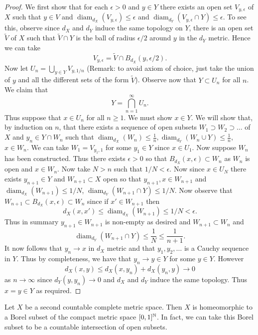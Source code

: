 \documentclass[twoside, a4paper, 10pt]{amsart}
\begin{document}
\begin{proof} We first show that for each $\epsilon>0$ and $y \in Y$ there exists an open set $V_{y,\epsilon}$ of $X$ such that $y \in V$ and $\operatorname{diam}_{d_X}(V_{y,\epsilon}) \leq \epsilon$ and $\operatorname{diam}_{d_Y}(V_{y,\epsilon} \cap Y) \leq \epsilon$. To see this, observe since $d_X$ and $d_Y$ induce the same topology on $Y$, there is an open set $\tilde{V}$ of $X$ such that $\tilde{V} \cap Y$ is the ball of radius $\epsilon/2$ around $y$ in the $d_Y$ metric. Hence we can take $$V_{y, \epsilon} = \tilde{V} \cap B_{d_X}(y, \epsilon/2).$$ Now let $U_n = \bigcup_{y \in Y} V_{y,1/n}$ (Remark: to avoid axiom of choice, just take the union of $y$ and all the different sets of the form $\tilde{V}$). Observe now that $Y \subset U_n$ for all $n$. 
We claim that $$Y = \bigcap_{n = 1}^{\infty} U_n.$$ Thus suppose that $x \in U_n$ for all $n \geq 1$. We must show $x \in Y$. We will show that, by induction on $n$, that there exists a sequence of open subsets $W_1 \supset W_2 \supset \ldots$ of $X$  and $y_n \in Y \cap W_n$ such that $\operatorname{diam}_{d_X}(W_n) \leq \frac{1}{n}, \operatorname{diam}_{d_Y}(W_n \cup Y) \leq \frac{1}{n}$, $x \in W_n$. 
We can take $W_1 = V_{y_1,1}$ for some $y_1 \in Y$ since $x \in U_1$. Now suppose $W_n$ has been constructed. Thus there exists $\epsilon>0$ so that $B_{d_X}(x, \epsilon) \subset W_n$ as $W_n$ is open and $x \in W_n$. Now take $N>n$ such that $1/N< \epsilon$. 
Now since $x \in U_N$ there exists $y_{n+1} \in Y$ and $W_{n+1} \subset X$ open so that $y_{n+1}, x \in W_{n+1}$ and $\operatorname{diam}_{d_X}(W_{n+1}) \leq 1/N$, $\operatorname{diam}_{d_Y}(W_{n+1} \cap Y) \leq 1/N$. 
Now observe that $W_{n+1} \subset B_{d_X}(x, \epsilon) \subset W_n$ since if $x' \in W_{n+1}$ then $$d_X(x,x') \leq \operatorname{diam}_{d_X}(W_{n+1}) \leq 1/N < \epsilon.$$ 
Thus in summary $y_{n+1} \in W_{n+1}$ is non-empty as desired and $W_{n+1} \subset W_n$ and $$\operatorname{diam}_{d_Y}(W_{n+1} \cap Y) \leq \frac{1}{N} \leq \frac{1}{n+1}.$$ 
It now follows that $y_n \to x$ in $d_X$ metric and that $y_1,y_2, \ldots$ is a Cauchy sequence in $Y$. Thus by completeness, we have that $y_n \to y \in Y$ for some $y \in Y$. However $$d_X(x,y) \leq d_X(x,y_n) + d_X(y_n,y) \to 0$$ as $n \to \infty$ since $d_Y(y,y_n) \to 0$ and $d_X$ and $d_Y$ induce the same topology. Thus $x=y \in Y$ as required.\end{proof}

\begin{corol}\label{corol: embedding Polish into compact} Let $X$ be a second countable complete metric space. Then $X$ is homeomorphic to a Borel subset of the compact metric space $[0,1]^{\mathbb{N}}$. In fact, we can take this Borel subset to be a countable intersection of open subsets.

\end{corol}
\end{document}
